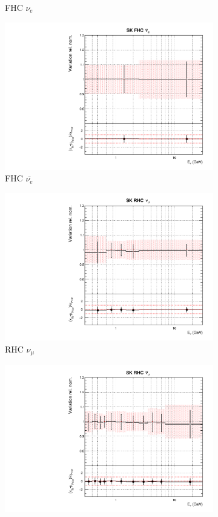 \begin{figure}[!htbp]
\begin{subfigure}{0.45\textwidth}
  \caption{\SK FHC $\nu_{e}$}
\end{subfigure}
\begin{subfigure}{0.45\textwidth}
  \centering
  \includegraphics[width=0.75\linewidth]{figs/asmvfluxpoly11}
  \caption{\SK FHC $\bar{\nu_{e}}$}
\end{subfigure}
\begin{subfigure}{0.45\textwidth}
  \centering
  \includegraphics[width=0.75\linewidth]{figs/asmvfluxpoly12}
  \caption{\SK RHC $\nu_{\mu}$}
\end{subfigure}
\begin{subfigure}{0.45\textwidth}
  \centering
  \includegraphics[width=0.75\linewidth]{figs/asmvfluxpoly13}

\end{subfigure}
\end{figure}
